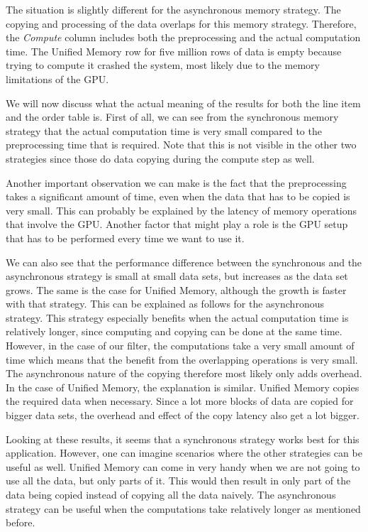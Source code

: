 \documentclass[a4paper,titlepage]{article}
\begin{document}
The situation is slightly different for the asynchronous memory strategy. The copying and processing of the data overlaps for this memory strategy. Therefore, the \emph{Compute} column includes both the preprocessing and the actual computation time. The Unified Memory row for five million rows of data is empty because trying to compute it crashed the system, most likely due to the memory limitations of the GPU.

We will now discuss what the actual meaning of the results for both the line item and the order table is. First of all, we can see from the synchronous memory strategy that the actual computation time is very small compared to the preprocessing time that is required. Note that this is not visible in the other two strategies since those do data copying during the compute step as well.

Another important observation we can make is the fact that the preprocessing takes a significant amount of time, even when the data that has to be copied is very small. This can probably be explained by the latency of memory operations that involve the GPU. Another factor that might play a role is the GPU setup that has to be performed every time we want to use it.

We can also see that the performance difference between the synchronous and the asynchronous strategy is small at small data sets, but increases as the data set grows. The same is the case for Unified Memory, although the growth is faster with that strategy. This can be explained as follows for the asynchronous strategy. This strategy especially benefits when the actual computation time is relatively longer, since computing and copying can be done at the same time. However, in the case of our filter, the computations take a very small amount of time which means that the benefit from the overlapping operations is very small. The asynchronous nature of the copying therefore most likely only adds overhead. In the case of Unified Memory, the explanation is similar. Unified Memory copies the required data when necessary. Since a lot more blocks of data are copied for bigger data sets, the overhead and effect of the copy latency also get a lot bigger.

Looking at these results, it seems that a synchronous strategy works best for this application. However, one can imagine scenarios where the other strategies can be useful as well. Unified Memory can come in very handy when we are not going to use all the data, but only parts of it. This would then result in only part of the data being copied instead of copying all the data naively. The asynchronous strategy can be useful when the computations take relatively longer as mentioned before.
\end{document}
